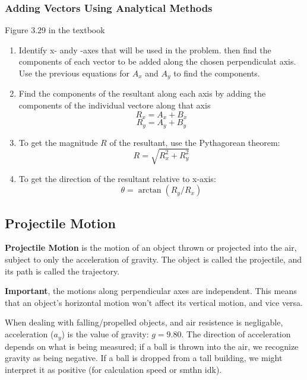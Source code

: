\documentclass{article}
\begin{document}
\subsubsection{Adding Vectors Using Analytical Methods}
Figure 3.29 in the textbook
\begin{enumerate}
\item Identify x- andy -axes that will be used in the problem. then find the components of each vector to be added along the chosen perpendiculat axis. Use the previous equations for $A_x$ and $A_y$ to find the components.
\item Find the components of the resultant along each axis by adding the components of the individual vectore along that axis \[R_x = A_x + B_x\] \[R_y = A_y + B_y\]
\item To get the magnitude $R$ of the resultant, use the Pythagorean theorem: \[R = \sqrt{R_x^2 + R_y^2}\]
\item To get the direction of the resultant relative to x-axis: \[\theta = \arctan (R_y/R_x)\]
\end{enumerate}
\subsection{Projectile Motion}
\textbf{Projectile Motion} is the motion of an object thrown or projected into the air, subject to only the acceleration of gravity.
The object is called the projectile, and its path is called the trajectory.

\textbf{Important}, the motions along perpendicular axes are independent. This means that an object's horizontal motion won't affect its vertical motion, and vice versa. 

When dealing with falling/propelled objects, and air resistence is negligable, acceleration ($a_y$) is the value of gravity: $g = 9.80$.
The direction of acceleration depends on what is being measured; if a ball is thrown into the air, we recognize gravity as being negative. If a ball is dropped from a tall building, we might interpret it as positive (for calculation speed or smthn idk).
\end{document}
